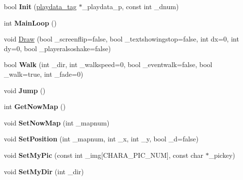 \begin{DoxyCompactItemize}
\item 
bool {\bfseries Init} (\hyperlink{structplaydata__tag}{playdata\+\_\+tag} $\ast$\+\_\+playdata\+\_\+p, const int \+\_\+dnum)\hypertarget{class_c_field_aeca01764ea3fa801e957396b0ec7ebe2}{}\label{class_c_field_aeca01764ea3fa801e957396b0ec7ebe2}

\item 
int {\bfseries Main\+Loop} ()\hypertarget{class_c_field_a7e7190d64b9b6ec0c8daef54edc6c21c}{}\label{class_c_field_a7e7190d64b9b6ec0c8daef54edc6c21c}

\item 
void \hyperlink{class_c_field_a7a9a8773b1277c3b9bb24695300e83f4}{Draw} (bool \+\_\+screenflip=false, bool \+\_\+textshowingstop=false, int dx=0, int dy=0, bool \+\_\+playeralsoshake=false)
\item 
bool {\bfseries Walk} (int \+\_\+dir, int \+\_\+walkspeed=0, bool \+\_\+eventwalk=false, bool \+\_\+walk=true, int \+\_\+fade=0)\hypertarget{class_c_field_a6bc0b60b618edb7542ada74214f43e79}{}\label{class_c_field_a6bc0b60b618edb7542ada74214f43e79}

\item 
void {\bfseries Jump} ()\hypertarget{class_c_field_a637d8d154c86aa3689e181740c783afb}{}\label{class_c_field_a637d8d154c86aa3689e181740c783afb}

\item 
int {\bfseries Get\+Now\+Map} ()\hypertarget{class_c_field_a4a8e2d4f4ab92bbc5c1a11447f2acfe6}{}\label{class_c_field_a4a8e2d4f4ab92bbc5c1a11447f2acfe6}

\item 
void {\bfseries Set\+Now\+Map} (int \+\_\+mapnum)\hypertarget{class_c_field_a26d1a70084c0c106749cc10c3a9b1e77}{}\label{class_c_field_a26d1a70084c0c106749cc10c3a9b1e77}

\item 
void {\bfseries Set\+Position} (int \+\_\+mapnum, int \+\_\+x, int \+\_\+y, bool \+\_\+d=false)\hypertarget{class_c_field_adbb9b4d407ed6d19c435a0096c6919e4}{}\label{class_c_field_adbb9b4d407ed6d19c435a0096c6919e4}

\item 
void {\bfseries Set\+My\+Pic} (const int \+\_\+img\mbox{[}C\+H\+A\+R\+A\+\_\+\+P\+I\+C\+\_\+\+N\+UM\mbox{]}, const char $\ast$\+\_\+pickey)\hypertarget{class_c_field_a59745375073813b2dabc0919eee79068}{}\label{class_c_field_a59745375073813b2dabc0919eee79068}

\item 
void {\bfseries Set\+My\+Dir} (int \+\_\+dir)\hypertarget{class_c_field_a94df6cb327cf2b049b99e03ed8820a1a}{}\label{class_c_field_a94df6cb327cf2b049b99e03ed8820a1a}


\end{DoxyCompactItemize}
